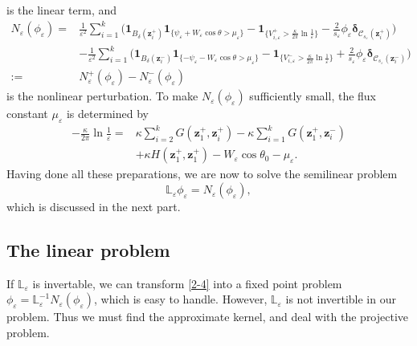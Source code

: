 \documentclass[12pt,reqno]{amsart}
\numberwithin{equation}{section}
\theoremstyle{definition}
\theoremstyle{remark}
\begin{document}
	is the linear term, and
	\begin{align*}
		N_\varepsilon(\phi_\varepsilon)=&\frac{1}{\varepsilon^2}\sum\limits_{i=1}^k\bigg(\boldsymbol1_{ B_\delta(\boldsymbol z_i^+)}\boldsymbol1_{\{\psi_\varepsilon+W_\varepsilon\cos\theta>\mu_\varepsilon\}}-\boldsymbol1_{\{V_{i,\varepsilon}^+>\frac{\kappa}{2\pi}\ln\frac{1}{\varepsilon}\}}-\frac{2}{s_\varepsilon}\phi_\varepsilon\boldsymbol\delta_{\mathcal C_{s_\varepsilon}(\boldsymbol z_i^+)}\bigg)\\
		&-\frac{1}{\varepsilon^2}\sum\limits_{i=1}^k\bigg(\boldsymbol1_{B_\delta(\boldsymbol z_i^-)}\boldsymbol1_{\{-\psi_\varepsilon-W_\varepsilon\cos\theta>\mu_\varepsilon\}}-\boldsymbol1_{\{V_{i,\varepsilon}^->\frac{\kappa}{2\pi}\ln\frac{1}{\varepsilon}\}}+\frac{2}{s_\varepsilon}\phi_\varepsilon\boldsymbol\delta_{\mathcal C_{s_\varepsilon}(\boldsymbol z_i^-)}\bigg)\\
		:=&N_\varepsilon^+(\phi_\varepsilon)-N_\varepsilon^-(\phi_\varepsilon)
	\end{align*}
	is the nonlinear perturbation. To make $N_\varepsilon(\phi_\varepsilon)$ sufficiently small, the flux constant $\mu_\varepsilon$ is determined by
	\begin{equation}\label{2-3}
		\begin{split}
		-\frac{\kappa}{2\pi}\ln\frac{1}{\varepsilon}=&\kappa\sum\limits_{i=2}^kG(\boldsymbol z_1^+,\boldsymbol z_i^+)-\kappa\sum\limits_{i=1}^kG(\boldsymbol z_1^+,\boldsymbol z_i^-)\\
		&+\kappa H(\boldsymbol z_1^+,\boldsymbol z_1^+)-W_\varepsilon\cos\theta_0-\mu_\varepsilon.
		\end{split}
	\end{equation}
	Having done all these preparations, we are now to solve the semilinear problem
	\begin{equation}\label{2-4}
		\mathbb L_\varepsilon\phi_\varepsilon=N_\varepsilon(\phi_\varepsilon),
	\end{equation}
	which is discussed in the next part.

\subsection{The linear problem}

If $\mathbb L_\varepsilon$ is invertable, we can transform \eqref{2-4} into a fixed point problem $\phi_\varepsilon=\mathbb L_\varepsilon^{-1}N_\varepsilon(\phi_\varepsilon)$, which is easy to handle. However, $\mathbb L_\varepsilon$ is not invertible in our problem. 
Thus we must find the approximate kernel, and deal with the projective problem.
\end{document}
